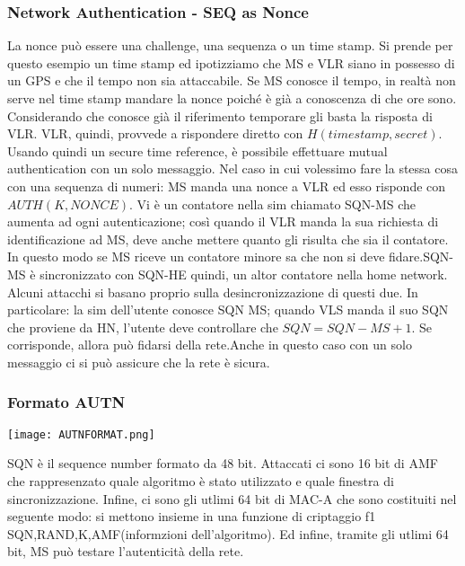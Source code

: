 \documentclass{article}
\theoremstyle{remark}
\begin{document}
\subsubsection{Network Authentication - SEQ as Nonce}
La nonce può essere una challenge, una sequenza o un time stamp. Si prende per questo esempio un time stamp ed ipotizziamo che MS e VLR siano in possesso di un GPS e che il tempo non sia attaccabile. Se MS conosce il tempo, in realtà non serve nel time stamp mandare la nonce poiché è già a conoscenza di che ore sono. Considerando che conosce già il riferimento temporare gli basta la risposta di VLR. VLR, quindi, provvede a rispondere diretto con $H(timestamp,secret)$. Usando quindi un secure time reference, è possibile effettuare mutual authentication con un solo messaggio.\newline
Nel caso in cui volessimo fare la stessa cosa con una sequenza di numeri:\newline
MS manda una nonce a VLR ed esso risponde con $AUTH(K,NONCE)$.  Vi è un contatore nella sim chiamato SQN-MS che aumenta ad ogni autenticazione; così quando il VLR manda la sua richiesta di identificazione ad MS, deve anche mettere quanto gli risulta che sia il contatore. In questo modo se MS riceve un contatore minore sa che non si deve fidare.SQN-MS è sincronizzato con SQN-HE quindi, un altor contatore nella home network. Alcuni attacchi si basano proprio sulla desincronizzazione di questi due. In particolare: la sim dell'utente conosce SQN MS; quando VLS manda il suo SQN che proviene da HN, l'utente deve controllare che $SQN=SQN-MS+1$. Se corrisponde, allora può fidarsi della rete.\newline Anche in questo caso con un solo messaggio ci si può assicure che la rete è sicura.
\subsubsection{Formato AUTN}
\begin{center}
	\texttt{[image: AUTNFORMAT.png]}
\end{center}
SQN è il sequence number formato da 48 bit. Attaccati ci sono 16 bit di AMF che rappresenzato quale algoritmo è stato utilizzato e quale finestra di sincronizzazione. Infine, ci sono gli utlimi 64 bit di MAC-A che sono costituiti nel seguente modo: si mettono insieme in una funzione di criptaggio f1 SQN,RAND,K,AMF(informzioni dell'algoritmo). Ed infine, tramite gli utlimi 64 bit, MS può testare l'autenticità della rete.
\end{document}
